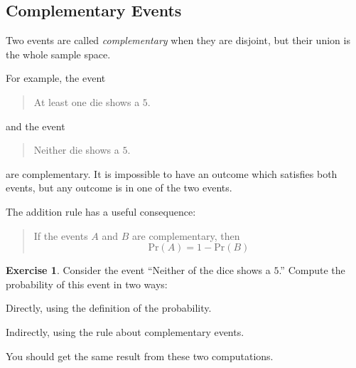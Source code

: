 \documentclass[12pt,letterpaper]{article}
\theoremstyle{definition}
\newtheorem{exercise}[question]{Exercise}
\begin{document}
\subsection*{Complementary Events}

Two events are called \emph{complementary} when they are disjoint, but their union is the whole sample space.

For example, the event 
\begin{quote}
At least one die shows a $5$.
\end{quote}
and the event
\begin{quote}
Neither die shows a $5$.
\end{quote}
are complementary.
It is impossible to have an outcome which satisfies both events, but any outcome is in one of the two events.

The addition rule has a useful consequence:
\begin{quote}
If the events $A$ and $B$ are complementary, then
\[
\mathrm{Pr}(A)  = 1 - \mathrm{Pr}(B)
\]
\end{quote}

\begin{exercise}
Consider the event ``Neither of the dice shows a $5$.''
Compute the probability of this event in two ways:
\begin{compactitem}
\item Directly, using the definition of the probability.
\item Indirectly, using the rule about complementary events.
\end{compactitem}
You should get the same result from these two computations.
\end{exercise}



\end{document}
